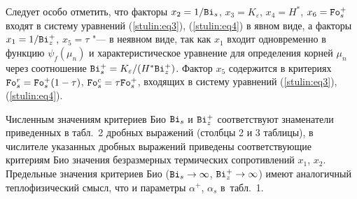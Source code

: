 Следует особо отметить, что факторы $x_2 =1/{\tt Bi}_s$, $x_3
=K_\varepsilon$, $x_4 =H^\ast$, $x_6 ={\tt Fo}_s^+ $ входят в систему
уравнений (\ref{stulin:eq3}), (\ref{stulin:eq4}) в явном виде, а
факторы $x_1 =1/{\tt Bi}_z^+ $, $x_5 =\tau $ "--- в неявном виде,
так как $x_1 $ входит одновременно в функцию $\psi _f (\mu _n )$ и
характеристическое уравнение для определения корней $\mu _n $ через
соотношение ${\tt Bi}_s^+ =K_\varepsilon / (H^\ast {\tt Bi}_z^+ )$.
Фактор $x_5 $ содержится в критериях ${\tt Fo}_s^r ={\tt Fo}_s^+ (1-\tau
)$, ${\tt Fo}_s^c =\tau {\tt Fo}_s^+ $, входящих в систему уравнений
(\ref{stulin:eq3}), (\ref{stulin:eq4}).

Численным значениям критериев Био ${\tt Bi}_s $ и ${\tt Bi}_z^+ $ соответствуют знаменатели приведенных в табл.~2 дробных выражений (столбцы 2 и 3 таблицы), в числителе указанных дробных выражений приведены соответствующие критериям
Био значения безразмерных термических сопротивлений $x_1$, $x_2$.
Предельные значения критериев Био (${\tt Bi}_s \to \infty$, ${\tt Bi}_z^+ \to \infty $)
имеют аналогичный теплофизический смысл, что и параметры $\alpha ^+$, $\alpha _s $ в~табл.~1.


